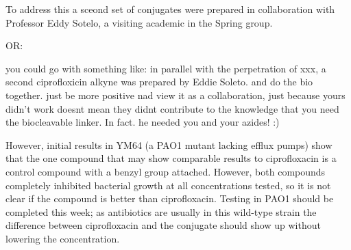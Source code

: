 To address this a sceond set of conjugates were prepared in collaboration with Professor Eddy Sotelo, a visiting academic in the Spring group. 

OR:

you could go with something like: in parallel with the perpetration of xxx, a second ciprofloxicin alkyne was prepared by Eddie Soleto. and do the bio together. just be more positive nad view it as a collaboration, just because yours didn't work doesnt mean they didnt contribute to the knowledge that you need the biocleavable linker. In fact. he needed you and your azides! :) 

However, initial results in YM64 (a PAO1 mutant lacking efflux pumps) show that the one compound that may show comparable results to ciprofloxacin is a control compound with a benzyl group attached. However, both compounds completely inhibited bacterial growth at all concentrations tested, so it is not clear if the compound is better than ciprofloxacin. Testing in PAO1 should be completed this week; as antibiotics are usually in this wild-type strain the difference between ciprofloxacin and the conjugate should show up without lowering the concentration. 